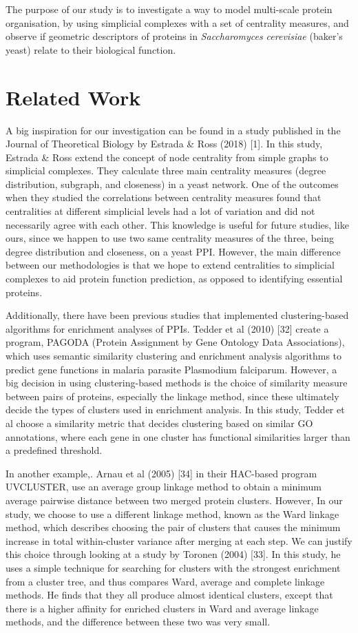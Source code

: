 \documentclass[9pt]{article}
\begin{document}
The purpose of our study is to investigate a way to model multi-scale protein organisation, by using simplicial complexes with a set of centrality measures, and observe if geometric descriptors of proteins in \textit{Saccharomyces cerevisiae} (baker’s yeast) relate to their biological function.

\section{Related Work}
A big inspiration for our investigation can be found in a study published in the Journal of Theoretical Biology by Estrada \& Ross (2018) [1]. In this study, Estrada \& Ross extend the concept of node centrality from simple graphs to simplicial complexes. They calculate three main centrality measures (degree distribution, subgraph, and closeness) in a yeast network. One of the outcomes when they studied the correlations between centrality measures found that centralities at different simplicial levels had a lot of variation and did not necessarily agree with each other. This knowledge is useful for future studies, like ours, since we happen to use two same centrality measures of the three, being degree distribution and closeness, on a yeast PPI. However, the main difference between our methodologies is that we hope to extend centralities to simplicial complexes to aid protein function prediction, as opposed to identifying essential proteins.

Additionally, there have been previous studies that implemented clustering-based algorithms for enrichment analyses of PPIs. Tedder et al (2010) [32] create a program, PAGODA (Protein Assignment by Gene Ontology Data Associations), which uses semantic similarity clustering and enrichment analysis algorithms to predict gene functions in malaria parasite Plasmodium falciparum. However, a big decision in using clustering-based methods is the choice of similarity measure between pairs of proteins, especially the linkage method, since these ultimately decide the types of clusters used in enrichment analysis. In this study, Tedder et al choose a similarity metric that decides clustering based on similar GO annotations, where each gene in one cluster has functional similarities larger than a predefined threshold. 

In another example,. Arnau et al (2005) [34] in their HAC-based program UVCLUSTER, use an average group linkage method to obtain a minimum average pairwise distance between two merged protein clusters. However, In our study, we choose to use a different linkage method, known as the Ward linkage method, which describes choosing the pair of clusters that causes the minimum increase in total within-cluster variance after merging at each step. We can justify this choice through looking at a study by Toronen (2004) [33]. In this study, he uses a simple technique for searching for clusters with the strongest enrichment from a cluster tree, and thus compares Ward, average and complete linkage methods. He finds that they all produce almost identical clusters, except that there is a higher affinity for enriched clusters in Ward and average linkage methods, and the difference between these two was very small.
\end{document}
